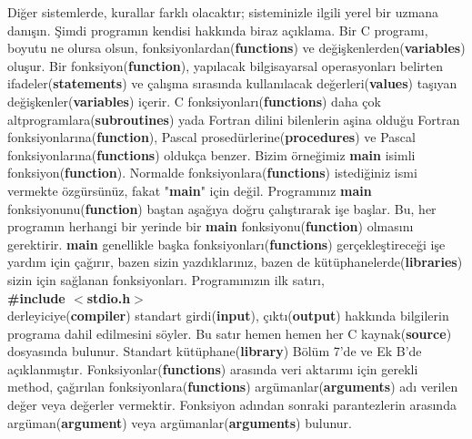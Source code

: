 \documentclass[a4paper,12pt,oneside]{book}
\begin{document}
Diğer sistemlerde, kurallar farklı olacaktır; sisteminizle ilgili yerel bir uzmana danışın.
Şimdi programın kendisi hakkında biraz açıklama. Bir C programı, boyutu ne olursa olsun, fonksiyonlardan(\textbf{functions}) ve değişkenlerden(\textbf{variables}) oluşur. Bir fonksiyon(\textbf{function}), yapılacak bilgisayarsal operasyonları belirten ifadeler(\textbf{statements}) ve çalışma sırasında kullanılacak değerleri(\textbf{values}) taşıyan değişkenler(\textbf{variables}) içerir. C fonksiyonları(\textbf{functions}) daha çok altprogramlara(\textbf{subroutines}) yada Fortran dilini bilenlerin aşina olduğu Fortran fonksiyonlarına(\textbf{function}), Pascal prosedürlerine(\textbf{procedures}) ve Pascal fonksiyonlarına(\textbf{functions}) oldukça benzer. Bizim örneğimiz \textbf{main} isimli fonksiyon(\textbf{function}). Normalde fonksiyonlara(\textbf{functions}) istediğiniz ismi vermekte özgürsünüz, fakat "\textbf{main}" için değil. Programınız \textbf{main} fonksiyonunu(\textbf{function}) baştan aşağıya doğru çalıştırarak işe başlar. Bu, her programın herhangi bir yerinde bir \textbf{main} fonksiyonu(\textbf{function}) olmasını gerektirir.
\textbf{main} genellikle başka fonksiyonları(\textbf{functions}) gerçekleştireceği işe yardım için çağırır, bazen sizin yazdıklarınız, bazen de kütüphanelerde(\textbf{libraries}) sizin için sağlanan fonksiyonları. Programınızın ilk satırı, \\

\textbf{\#include $<$stdio.h$>$} \\

derleyiciye(\textbf{compiler}) standart girdi(\textbf{input}), çıktı(\textbf{output}) hakkında bilgilerin programa dahil edilmesini söyler. Bu satır hemen hemen her C kaynak(\textbf{source}) dosyasında bulunur. Standart kütüphane(\textbf{library}) Bölüm 7'de ve Ek B'de açıklanmıştır.
Fonksiyonlar(\textbf{functions}) arasında veri aktarımı için gerekli method, çağırılan fonksiyonlara(\textbf{functions}) argümanlar(\textbf{arguments}) adı verilen değer veya değerler vermektir. Fonksiyon adından sonraki parantezlerin arasında argüman(\textbf{argument}) veya argümanlar(\textbf{arguments}) bulunur. \\
\end{document}

